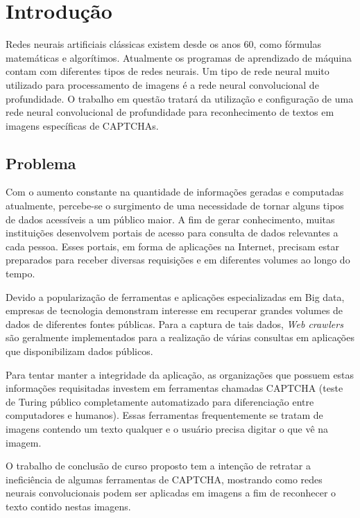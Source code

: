 \chapter{Introdução}

Redes neurais artificiais clássicas existem desde os anos 60, como fórmulas  
matemáticas e algorítimos. Atualmente os programas de aprendizado de máquina  
contam com diferentes tipos de redes neurais. Um tipo de rede neural muito  
utilizado para processamento de imagens é a rede neural convolucional de  
profundidade. O trabalho em questão tratará da utilização e
configuração de uma rede neural convolucional de profundidade para
reconhecimento de textos em imagens específicas de CAPTCHAs.

\section{Problema}

Com o aumento constante na quantidade de informações geradas e 
computadas atualmente, percebe-se o surgimento de uma necessidade de tornar
alguns tipos de dados acessíveis a um público maior. A fim de gerar
conhecimento, muitas instituições desenvolvem portais de acesso para
consulta de dados relevantes a cada pessoa. Esses portais, em forma de
aplicações na Internet, precisam estar preparados para receber
diversas requisições e em diferentes volumes ao longo do tempo.

Devido a popularização de ferramentas e aplicações especializadas em Big
data, empresas de tecnologia demonstram interesse em recuperar grandes
volumes de dados de diferentes fontes públicas. Para a captura de tais
dados, \textit{Web crawlers} são geralmente implementados para a
realização de várias consultas em aplicações que disponibilizam dados
públicos.

Para tentar manter a integridade da aplicação, as organizações que possuem  
estas informações requisitadas investem em ferramentas chamadas CAPTCHA  
(teste de Turing público completamente automatizado para diferenciação entre  
computadores e humanos). Essas ferramentas frequentemente se tratam de  
imagens contendo um texto qualquer e o usuário precisa digitar o que vê na  
imagem. 

O trabalho de conclusão de curso proposto tem a intenção de retratar a  
ineficiência de algumas ferramentas de CAPTCHA, mostrando como redes neurais  
convolucionais podem ser aplicadas em imagens a fim de reconhecer o texto  
contido nestas imagens. 

